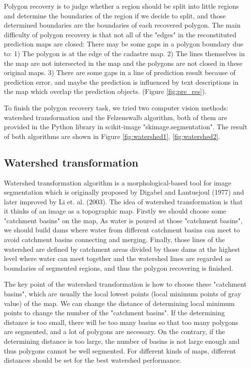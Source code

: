 \documentclass[12pt]{article}
\begin{document}
Polygon recovery is to judge whether a region should be split into little regions and determine the boundaries of the region if we decide to split, and those determined boundaries are the boundaries of each recovered polygon. The main difficulty of polygon recovery is that not all of the "edges" in the reconstituted prediction maps are closed: There may be some gaps in a polygon boundary due to: 1) The polygon is at the edge of the cadastre map. 2) The lines themselves in the map are not intersected in the map and the polygons are not closed in these original maps. 3) There are some gaps in a line of prediction result because of prediction error, and maybe the prediction is influenced by text descriptions in the map which overlap the prediction objects. (Figure \ref{fig:pre_res}). 

To finish the polygon recovery task, we tried two computer vision methods: watershed transformation and the Felzenswalb algorithm, both of them are provided in the Python library in scikit-image\cite{van2014scikit} "skimage.segmentation". The result of both algorithms are shown in Figure \ref{fig:watershed1}, \ref{fig:watershed2}.

\subsection{Watershed transformation}

Watershed transformation algorithm is a morphological-based tool for image segmentation which is originally proposed by Digabel and Lantuejoul (1977) and later improved by Li et. al. (2003)\cite{khiyal2009modified, li2003improved}. The idea of watershed transformation is that it thinks of an image as a topographic map. Firstly we should choose some "catchment basins" on the map,  As water is poured at those "catchment basins", we should build dams where water from different catchment basins can meet to avoid catchment basins connecting and merging. Finally, those lines of the watershed are defined by catchment areas divided by those dams at the highest level where water can meet together and the watershed lines are regarded as boundaries of segmented regions, and thus the polygon recovering is finished.

The key point of the watershed transformation is how to choose these "catchment basins", which are usually the local lowest points (local minimum points of gray value) of the map. We can change the distance of determining local minimum points to change the number of the "catchment basins". If the determining distance is too small, there will be too many basins so that too many polygons are segmented, and a lot of polygons are necessary. On the contrary, if the determining distance is too large, the number of basins is not large enough and thus polygons cannot be well segmented. For different kinds of maps, different distances should be set for the best watershed performance.  
\end{document}
